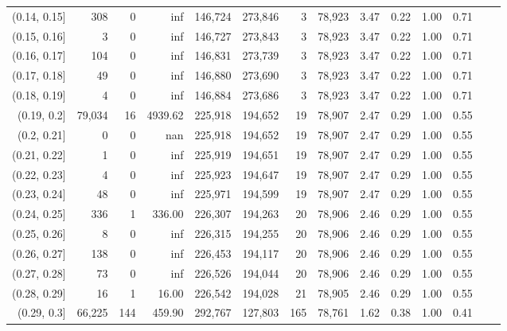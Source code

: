 \begin{tabular}{rrrrrrrrrrrrrr}
(0.14, 0.15]   &     308 &       0 &       inf &  146,724 &  273,846 &       3 &  78,923 &  3.47 &  0.22 &  1.00 &      0.71 \\
(0.15, 0.16]   &       3 &       0 &       inf &  146,727 &  273,843 &       3 &  78,923 &  3.47 &  0.22 &  1.00 &      0.71 \\
(0.16, 0.17]   &     104 &       0 &       inf &  146,831 &  273,739 &       3 &  78,923 &  3.47 &  0.22 &  1.00 &      0.71 \\
(0.17, 0.18]   &      49 &       0 &       inf &  146,880 &  273,690 &       3 &  78,923 &  3.47 &  0.22 &  1.00 &      0.71 \\
(0.18, 0.19]   &       4 &       0 &       inf &  146,884 &  273,686 &       3 &  78,923 &  3.47 &  0.22 &  1.00 &      0.71 \\
(0.19, 0.2]    &  79,034 &      16 &   4939.62 &  225,918 &  194,652 &      19 &  78,907 &  2.47 &  0.29 &  1.00 &      0.55 \\
(0.2, 0.21]    &       0 &       0 &       nan &  225,918 &  194,652 &      19 &  78,907 &  2.47 &  0.29 &  1.00 &      0.55 \\
(0.21, 0.22]   &       1 &       0 &       inf &  225,919 &  194,651 &      19 &  78,907 &  2.47 &  0.29 &  1.00 &      0.55 \\
(0.22, 0.23]   &       4 &       0 &       inf &  225,923 &  194,647 &      19 &  78,907 &  2.47 &  0.29 &  1.00 &      0.55 \\
(0.23, 0.24]   &      48 &       0 &       inf &  225,971 &  194,599 &      19 &  78,907 &  2.47 &  0.29 &  1.00 &      0.55 \\
(0.24, 0.25]   &     336 &       1 &    336.00 &  226,307 &  194,263 &      20 &  78,906 &  2.46 &  0.29 &  1.00 &      0.55 \\
(0.25, 0.26]   &       8 &       0 &       inf &  226,315 &  194,255 &      20 &  78,906 &  2.46 &  0.29 &  1.00 &      0.55 \\
(0.26, 0.27]   &     138 &       0 &       inf &  226,453 &  194,117 &      20 &  78,906 &  2.46 &  0.29 &  1.00 &      0.55 \\
(0.27, 0.28]   &      73 &       0 &       inf &  226,526 &  194,044 &      20 &  78,906 &  2.46 &  0.29 &  1.00 &      0.55 \\
(0.28, 0.29]   &      16 &       1 &     16.00 &  226,542 &  194,028 &      21 &  78,905 &  2.46 &  0.29 &  1.00 &      0.55 \\
(0.29, 0.3]    &  66,225 &     144 &    459.90 &  292,767 &  127,803 &     165 &  78,761 &  1.62 &  0.38 &  1.00 &      0.41 \\

\end{tabular}
